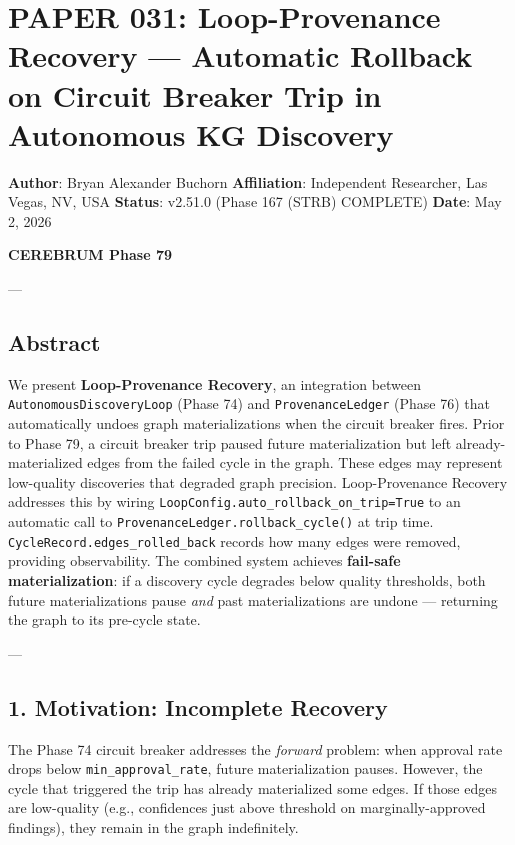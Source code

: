 \section{PAPER 031: Loop-Provenance Recovery — Automatic Rollback on Circuit Breaker Trip in Autonomous KG Discovery}

\textbf{Author}: Bryan Alexander Buchorn  
\textbf{Affiliation}: Independent Researcher, Las Vegas, NV, USA  
\textbf{Status}: v2.51.0 (Phase 167 (STRB) COMPLETE)
\textbf{Date}: May 2, 2026

\textbf{CEREBRUM Phase 79}

---

\subsection{Abstract}

We present \textbf{Loop-Provenance Recovery}, an integration between \texttt{AutonomousDiscoveryLoop} (Phase 74) and \texttt{ProvenanceLedger} (Phase 76) that autom\-atically undoes graph mater\-ializations when the circuit breaker fires. Prior to Phase 79, a circuit breaker trip paused future mater\-ialization but left already-mater\-ialized edges from the failed cycle in the graph. These edges may represent low-quality discoveries that degraded graph precision. Loop-Provenance Recovery addresses this by wiring \texttt{LoopConfig.auto\_rollback\_on\_trip=True} to an automatic call to \texttt{ProvenanceLedger.rollback\_cycle()} at trip time. \texttt{CycleRecord.edges\_rolled\_back} records how many edges were removed, providing obser\-vability. The combined system achieves \textbf{fail-safe mater\-ialization}: if a discovery cycle degrades below quality thresholds, both future mater\-ializations pause \textit{and} past mater\-ializations are undone — returning the graph to its pre-cycle state.

---

\subsection{1. Motivation: Incomplete Recovery}

The Phase 74 circuit breaker addresses the \textit{forward} problem: when approval rate drops below \texttt{min\_approval\_rate}, future mater\-ialization pauses. However, the cycle that triggered the trip has already mater\-ialized some edges. If those edges are low-quality (e.g., confidences just above threshold on marginally-approved findings), they remain in the graph indef\-initely.

